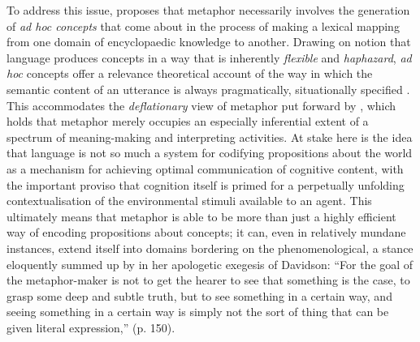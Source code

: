 To address this issue, \cite{Carston2010} proposes that metaphor necessarily involves the generation of \emph{ad hoc concepts} that come about in the process of making a lexical mapping from one domain of encyclopaedic knowledge to another.  Drawing on  notion that language produces concepts in a way that is inherently \emph{flexible} and \emph{haphazard}, \emph{ad hoc} concepts offer a relevance theoretical account of the way in which the semantic content of an utterance is always pragmatically, situationally specified \citep{SperberEA1995}.  This accommodates the \emph{deflationary} view of metaphor put forward by \cite{SperberEA2012}, which holds that metaphor merely occupies an especially inferential extent of a spectrum of meaning-making and interpreting activities.  At stake here is the idea that language is not so much a system for codifying propositions about the world as a mechanism for achieving optimal communication of cognitive content, with the important proviso that cognition itself is primed for a perpetually unfolding contextualisation of the environmental stimuli available to an agent.  This ultimately means that metaphor is able to be more than just a highly efficient way of encoding propositions about concepts; it can, even in relatively mundane instances, extend itself into domains bordering on the phenomenological, a stance eloquently summed up by \cite{Reimer2001} in her apologetic exegesis of Davidson: ``For the goal of the metaphor-maker is not to get the hearer to see that something is the case, to grasp some deep and subtle truth, but to see something in a certain way, and seeing something in a certain way is simply not the sort of thing that can be given literal expression,'' (p. 150).

